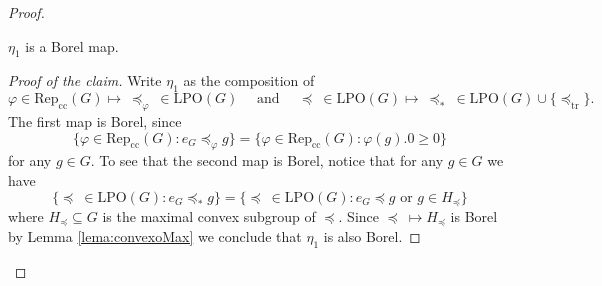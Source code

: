 \documentclass[reqno]{amsart}
\begin{document}
\begin{proof}
\setcounter{claimnum}{0}
\begin{claimnum}
$\eta_1$ is a Borel map.
\end{claimnum}
\begin{proof}[Proof of the claim]
Write $\eta_1$ as the composition of 
\[
	\varphi \in \mathrm{Rep}_\mathrm{cc}(G) \mapsto \ \preceq_\varphi \  \in \mathrm{LPO}(G) \quad \text{ and }\quad \preceq \ \in \mathrm{LPO}(G) \mapsto \ \preceq_\ast \ \in \mathrm{LPO}(G) \cup \{\preceq_\mathrm{tr}\}.
\]
The first map is Borel, since
\[
	\{\varphi \in \mathrm{Rep}_\mathrm{cc}(G) : e_G \preceq_\varphi g\} = \{\varphi \in \mathrm{Rep}_\mathrm{cc}(G) : \varphi(g).0 \geq 0\}
\]
for any $g \in G$. To see that the second map is Borel, notice that for any $g \in G$ we have
\[
	\{\preceq \ \in \mathrm{LPO}(G) : e_G \preceq_\ast g\} = \{\preceq \ \in \mathrm{LPO}(G) : e_G \preceq g \text{ or }g \in H_\preceq\}
\]
where $H_\preceq \subseteq G$ is the maximal convex subgroup of $\preceq$. Since $\preceq \ \mapsto H_\preceq$ is Borel by Lemma \ref{lema:convexoMax} we conclude that $\eta_1$ is also Borel.
\end{proof}


\end{proof}
\end{document}
